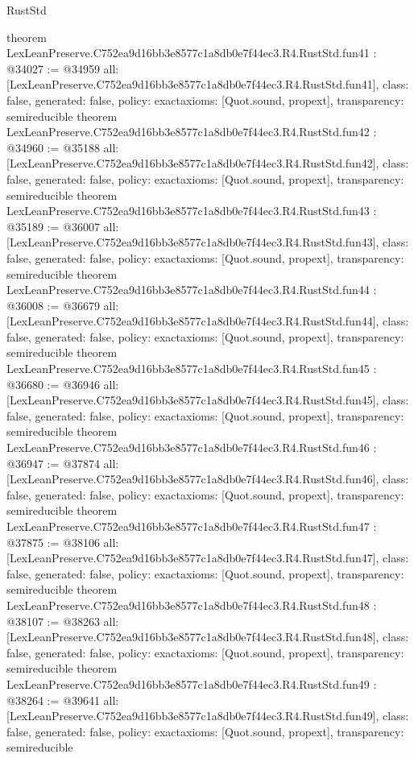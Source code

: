 \begin{lexlean}{RustStd}
\begin{coremodule}
{}
theorem LexLeanPreserve.C752ea9d16bb3e8577c1a8db0e7f44ec3.R4.RustStd.fun41 : @34027 := @34959 {
  all: [LexLeanPreserve.C752ea9d16bb3e8577c1a8db0e7f44ec3.R4.RustStd.fun41],
  class: false,
  generated: false,
  policy: exact{axioms: [Quot.sound, propext]},
  transparency: semireducible
}
theorem LexLeanPreserve.C752ea9d16bb3e8577c1a8db0e7f44ec3.R4.RustStd.fun42 : @34960 := @35188 {
  all: [LexLeanPreserve.C752ea9d16bb3e8577c1a8db0e7f44ec3.R4.RustStd.fun42],
  class: false,
  generated: false,
  policy: exact{axioms: [Quot.sound, propext]},
  transparency: semireducible
}
theorem LexLeanPreserve.C752ea9d16bb3e8577c1a8db0e7f44ec3.R4.RustStd.fun43 : @35189 := @36007 {
  all: [LexLeanPreserve.C752ea9d16bb3e8577c1a8db0e7f44ec3.R4.RustStd.fun43],
  class: false,
  generated: false,
  policy: exact{axioms: [Quot.sound, propext]},
  transparency: semireducible
}
theorem LexLeanPreserve.C752ea9d16bb3e8577c1a8db0e7f44ec3.R4.RustStd.fun44 : @36008 := @36679 {
  all: [LexLeanPreserve.C752ea9d16bb3e8577c1a8db0e7f44ec3.R4.RustStd.fun44],
  class: false,
  generated: false,
  policy: exact{axioms: [Quot.sound, propext]},
  transparency: semireducible
}
theorem LexLeanPreserve.C752ea9d16bb3e8577c1a8db0e7f44ec3.R4.RustStd.fun45 : @36680 := @36946 {
  all: [LexLeanPreserve.C752ea9d16bb3e8577c1a8db0e7f44ec3.R4.RustStd.fun45],
  class: false,
  generated: false,
  policy: exact{axioms: [Quot.sound, propext]},
  transparency: semireducible
}
theorem LexLeanPreserve.C752ea9d16bb3e8577c1a8db0e7f44ec3.R4.RustStd.fun46 : @36947 := @37874 {
  all: [LexLeanPreserve.C752ea9d16bb3e8577c1a8db0e7f44ec3.R4.RustStd.fun46],
  class: false,
  generated: false,
  policy: exact{axioms: [Quot.sound, propext]},
  transparency: semireducible
}
theorem LexLeanPreserve.C752ea9d16bb3e8577c1a8db0e7f44ec3.R4.RustStd.fun47 : @37875 := @38106 {
  all: [LexLeanPreserve.C752ea9d16bb3e8577c1a8db0e7f44ec3.R4.RustStd.fun47],
  class: false,
  generated: false,
  policy: exact{axioms: [Quot.sound, propext]},
  transparency: semireducible
}
theorem LexLeanPreserve.C752ea9d16bb3e8577c1a8db0e7f44ec3.R4.RustStd.fun48 : @38107 := @38263 {
  all: [LexLeanPreserve.C752ea9d16bb3e8577c1a8db0e7f44ec3.R4.RustStd.fun48],
  class: false,
  generated: false,
  policy: exact{axioms: [Quot.sound, propext]},
  transparency: semireducible
}
theorem LexLeanPreserve.C752ea9d16bb3e8577c1a8db0e7f44ec3.R4.RustStd.fun49 : @38264 := @39641 {
  all: [LexLeanPreserve.C752ea9d16bb3e8577c1a8db0e7f44ec3.R4.RustStd.fun49],
  class: false,
  generated: false,
  policy: exact{axioms: [Quot.sound, propext]},
  transparency: semireducible
}
\end{coremodule}
\end{lexlean}
